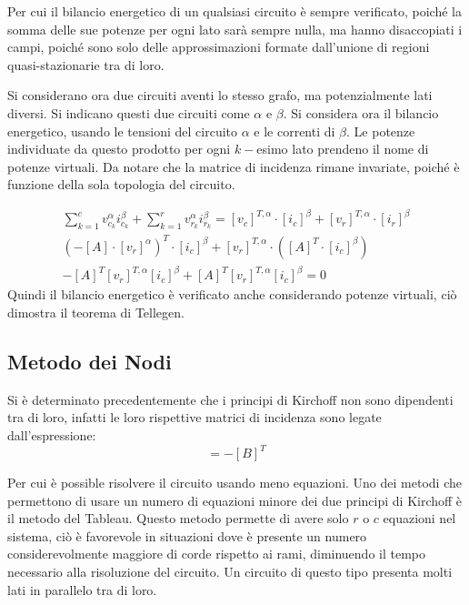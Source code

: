 \documentclass{article}
\numberwithin{equation}{subsection}
\begin{document}
Per cui il bilancio energetico di un qualsiasi circuito è sempre verificato, poiché la somma delle sue potenze per ogni lato sarà sempre nulla, ma hanno disaccopiati 
i campi, poiché sono solo delle approssimazioni formate dall'unione di regioni quasi-stazionarie tra di loro. 

Si considerano ora due circuiti aventi lo stesso grafo, ma potenzialmente lati diversi. Si indicano questi due circuiti come $\alpha$ e $\beta$. Si considera ora il 
bilancio energetico, usando le tensioni del circuito $\alpha$ e le correnti di $\beta$. Le potenze individuate da questo prodotto per ogni $k-$esimo lato prendeno il nome 
di potenze virtuali. Da notare che la matrice di incidenza rimane invariate, poiché è funzione della sola topologia del circuito. 

\begin{gather*}
    \displaystyle\sum_{k=1}^cv_{c_k}^\alpha i_{c_k}^\beta+\sum_{k=1}^rv_{r_k}^\alpha i_{r_k}^\beta=[v_c]^{T,\alpha}\cdot[i_c]^\beta+[v_r]^{T,\alpha}\cdot[i_r]^\beta\\
    \left(-[A]\cdot[v_r]^\alpha\right)^T\cdot[i_c]^\beta+[v_r]^{T,\alpha}\cdot\left([A]^T\cdot[i_c]^\beta\right)\\
    -[A]^T[v_r]^{T,\alpha}[i_c]^\beta+[A]^T[v_r]^{T,\alpha}[i_c]^\beta=0
\end{gather*}
Quindi il bilancio energetico è verificato anche considerando potenze virtuali, ciò dimostra il teorema di Tellegen. 

\subsection{Metodo dei Nodi}

Si è determinato precedentemente che i principi di Kirchoff non sono dipendenti tra di loro, infatti le loro rispettive matrici di incidenza sono legate dall'espressione:
\begin{equation*}
    [A]=-[B]^T
\end{equation*}

Per cui è possible risolvere il circuito usando meno equazioni. Uno dei metodi che permettono di usare un numero di equazioni minore dei due principi di Kirchoff è il metodo 
del Tableau. Questo metodo permette di avere solo $r$ o $c$ equazioni nel sistema, ciò è favorevole in situazioni dove è presente un numero considerevolmente maggiore di 
corde rispetto ai rami, diminuendo il tempo necessario alla risoluzione del circuito. Un circuito di questo tipo presenta molti lati in parallelo tra di loro. 
\end{document}
